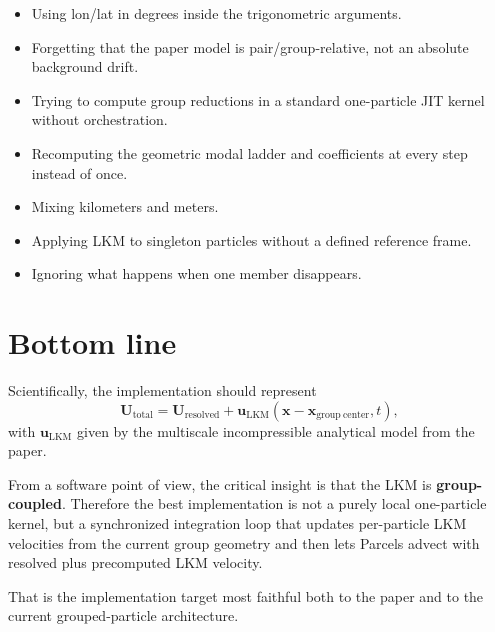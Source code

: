 \documentclass[11pt,a4paper]{article}
\begin{document}
	\begin{itemize}[leftmargin=1.5em]
		\item Using lon/lat in degrees inside the trigonometric arguments.
		\item Forgetting that the paper model is pair/group-relative, not an absolute background drift.
		\item Trying to compute group reductions in a standard one-particle JIT kernel without orchestration.
		\item Recomputing the geometric modal ladder and coefficients at every step instead of once.
		\item Mixing kilometers and meters.
		\item Applying LKM to singleton particles without a defined reference frame.
		\item Ignoring what happens when one member disappears.
	\end{itemize}
	
	\section{Bottom line}
	
	Scientifically, the implementation should represent
	\begin{equation}
		\mathbf{U}_{\mathrm{total}} = \mathbf{U}_{\mathrm{resolved}} + \mathbf{u}_{\mathrm{LKM}}(\mathbf{x}-\mathbf{x}_{\mathrm{group\ center}},t),
	\end{equation}
	with $\mathbf{u}_{\mathrm{LKM}}$ given by the multiscale incompressible analytical model from the paper.
	
	From a software point of view, the critical insight is that the LKM is \textbf{group-coupled}. Therefore the best implementation is not a purely local one-particle kernel, but a synchronized integration loop that updates per-particle LKM velocities from the current group geometry and then lets Parcels advect with resolved plus precomputed LKM velocity.
	
	That is the implementation target most faithful both to the paper and to the current grouped-particle architecture.
	
\end{document}
